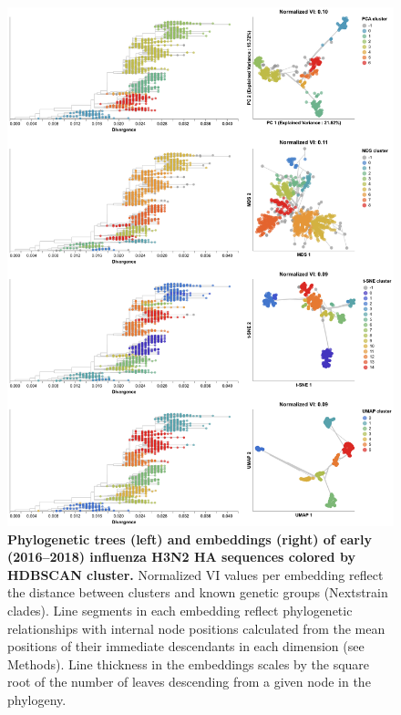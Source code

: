 \documentclass[webpdf,contemporary,large,single]{oup-authoring-template}%
\theoremstyle{thmstyleone}%
\theoremstyle{thmstyletwo}%
\theoremstyle{thmstylethree}%
\begin{document}
\begin{figure}[!h]
\includegraphics[width=0.9\columnwidth]{figures/flu-2016-2018-ha-embeddings-by-cluster.png}
\caption{{\bf Phylogenetic trees (left) and embeddings (right) of early (2016--2018) influenza H3N2 HA sequences colored by HDBSCAN cluster.}
  Normalized VI values per embedding reflect the distance between clusters and known genetic groups (Nextstrain clades).
  Line segments in each embedding reflect phylogenetic relationships with internal node positions calculated from the mean positions of their immediate descendants in each dimension (see Methods).
  Line thickness in the embeddings scales by the square root of the number of leaves descending from a given node in the phylogeny.}
\label{fig:seasonal-influenza-h3n2-ha-2016-2018-clusters}
\end{figure}
\end{document}
